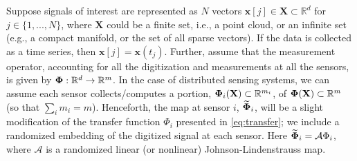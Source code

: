 Suppose signals of interest are represented as $N$ vectors $\mathbf{x}[j] \in \mathbf{X}\subset \mathbb{R}^d$ %
for $j\in\{1,...,N\}$,
where $\mathbf{X}$ could be a finite set, i.e., a
point cloud, or an infinite set (e.g., a compact manifold, or the set
of all sparse vectors).  If the data is collected as a time series, then $\mathbf{x}[j] = \mathbf{x}(t_j)$.
Further, assume that the measurement operator, accounting for all the digitization and measurements at all the sensors, is given by $\mathbf{\Phi}:\mathbb{R}^d \to \mathbb{R}^m$.  
In the case of distributed sensing systems, we can assume each sensor collects/computes a portion, $\mathbf{\Phi}_i (\mathbf{X}) \subset \mathbb{R}^{m_i}$, of $\mathbf{\Phi}( \mathbf{X}) \subset \mathbb{R}^m$ (so that $\sum_i{m_i}=m$).
Henceforth, the map at sensor $i$, $\widetilde{\mathbf{\Phi}}_i$, will be a slight modification of the transfer function $\Phi_i$ presented in \eqref{eq:transfer}; we include a randomized embedding of the digitized signal at each sensor. Here $\widetilde{\mathbf{\Phi}}_i = \mathcal{A}\Phi_i$, where $\mathcal{A}$ is a randomized linear (or nonlinear) Johnson-Lindenstrauss map.
%
%
